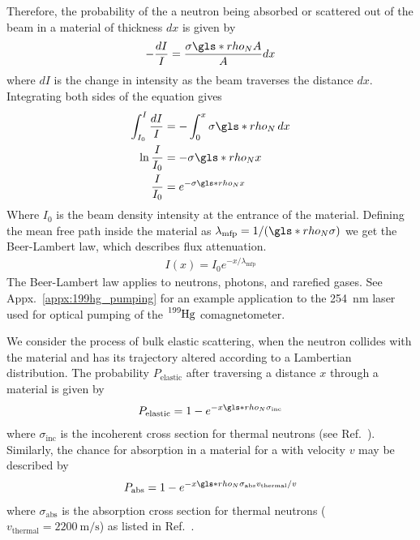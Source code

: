 Therefore, the probability of the a neutron being absorbed or scattered out of the beam in a material of thickness $dx$ is given by
%
\begin{gather}
    -\frac{dI}{I}=\frac{\sigma\gls*{rho_N} A}{A}dx
\end{gather}
%
where $dI$ is the change in intensity as the beam traverses the distance $dx$. Integrating both sides of the equation gives
%
\begin{align}
    \int^I_{I_0}\frac{dI}{I} &= -\int^x_0 \sigma \gls*{rho_N} \,dx \\
    \ln \frac{I}{I_0} &= -\sigma \gls*{rho_N} x \\
    \frac{I}{I_0} &= e^{-\sigma \gls*{rho_N} x} \label{eq:beer_lambert_law_variant}
\end{align}
%
Where $I_0$ is the beam density intensity at the entrance of the material. Defining the mean free path inside the material as $\lambda_\text{mfp}=1/(\gls*{rho_N} \sigma)$ we get the Beer-Lambert law, which describes flux attenuation.
%
\begin{gather}
    I(x) = I_0 e^{-x/\lambda_\text{mfp}} \label{eq:beer_lambert_law}
\end{gather}
%
 The Beer-Lambert law applies to neutrons, photons, and rarefied gases. See Appx.~\ref{appx:199hg_pumping} for an example application to the \qty{254}{\nano\meter} laser used for optical pumping of the $\ce{^199Hg}$ comagnetometer. 
 
 We consider the process of bulk elastic scattering, when the neutron collides with the material and has its trajectory altered according to a Lambertian distribution. The probability $P_\text{elastic}$ after traversing a distance $x$ through a material is given by
%
\begin{gather}
    P_\text{elastic}=1-e^{-x \gls*{rho_N} \sigma_\text{inc}}
\end{gather}
%
where $\sigma_\text{inc}$ is the incoherent cross section for thermal neutrons (see Ref.~\cite{nist_neutron_cross_sections}). Similarly, the chance for absorption in a material for a \ucn with velocity $v$ may be described by
%
\begin{gather}
    P_\text{abs}= 1-e^{-x \gls*{rho_N} \sigma_\text{abs}v_\text{thermal}/v}
\end{gather}
%
where $\sigma_\text{abs}$ is the absorption cross section for thermal neutrons ($v_\text{thermal}=\qty{2200}{\meter\per \s}$) as listed in Ref.~\cite{nist_neutron_cross_sections}.

